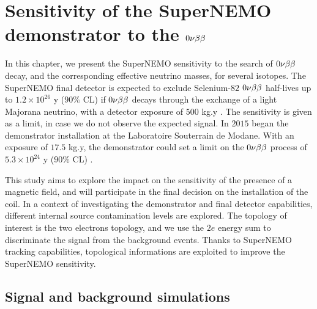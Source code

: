 \chapter{Sensitivity of the SuperNEMO demonstrator to the $0\nu\beta\beta$}
\label{ch:sensitivity}

In this chapter, we present the SuperNEMO sensitivity to the search of $0\nu\beta\beta$ decay, and the corresponding effective neutrino masses, for several isotopes.
The SuperNEMO final detector is expected to exclude Selenium-$82$ $0\nu\beta\beta$ half-lives up to $1.2\times 10^{26}$ y ($90\%$ CL) if $0\nu\beta\beta$ decays through the exchange of a light Majorana neutrino, with a detector exposure of $500$ kg.y \cite{art:SuperNEMO2010}.
The sensitivity is given as a limit, in case we do not observe the expected signal.
In $2015$ began the demonstrator installation at the Laboratoire Souterrain de Modane.
With an exposure of $17.5$ kg.y, the demonstrator could set a limit on the $0\nu\beta\beta$ process of $5.3\times 10^{24}$ y ($90\%$ CL) \cite{CalvezThesis}.

This study aims to explore the impact on the sensitivity of the presence of a magnetic field, and will participate in the final decision on the installation of the coil.
In a context of investigating the demonstrator and final detector capabilities, different internal source contamination levels are explored.
The topology of interest is the two electrons topology, and we use the $2e$ energy sum to discriminate the signal from the background events.
Thanks to SuperNEMO tracking capabilities, topological informations are exploited to improve the SuperNEMO sensitivity.



\section{Signal and background simulations}
\label{sec:sensitivity_simus}


